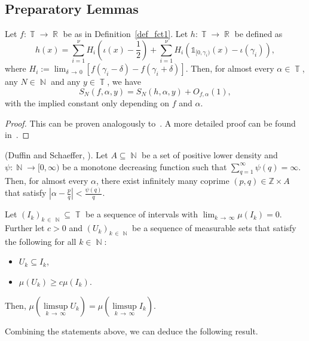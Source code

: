 \documentclass[AHL,Unicode,longabstracts,published]{cedram}
\DeclareMathOperator{\R}{\mathbb{R}}
\DeclareMathOperator{\N}{\mathbb{N}}
\DeclareMathOperator{\T}{\mathbb{T}}
\newcommand{\bbZ}{\mathbb{Z}}
\begin{document}
\subsection{Preparatory Lemmas}\label{Sec_prepLemmas}

\begin{prop}\label{LemRepresentationf}
Let $f : \T \rightarrow \R$ be as in Definition~\ref{def_fct1}. Let $h:\T \to \R$ be defined as
\[
h(x) = \sum_{i=1}^{\nu} H_i\left (\iota(x) - \frac{1}{2} \right) + \sum_{i=1}^{\nu} H_i \left(\mathds{1}_{[0, \gamma_i)}(x) -\iota(\gamma_i) \right),
\]
where $H_i := \lim_{\delta\,\rightarrow\,0} [f(\gamma_i - \delta) - f(\gamma_i + \delta)]$. Then, for almost every $\alpha \in \T$, any $N \in \N$ and any $y \in \T$, we have
\[
S_N(f,\alpha,y) = S_N(h,\alpha,y) + O_{f, \alpha}(1),
\]
with the implied constant only depending on $f$ and $\alpha$.
\end{prop}

\begin{proof}
This can be proven analogously to~\cite[Lemma~3.1]{upper_dens}. A more detailed proof can be found in~\cite[Appendix~A]{quenched}.
\end{proof}

\begin{prop}\label{ds_thm}
(Duffin and Schaeffer, \cite[Theorem~3]{duff_sch}).
Let $A \subseteq \N$ be a set of positive lower density and $\psi: \N \to [0,\infty)$ be a monotone decreasing function such that $\sum_{q =1}^{\infty} \psi(q) = \infty$. Then, for almost every $\alpha$, there exist infinitely many coprime $(p,q) \in \bbZ \times A$ that satisfy $| \alpha - \frac{p}{q}| < \frac{\psi(q)}{q}$.
\end{prop}

\begin{prop}\label{gallagher}
Let $(I_k)_{k\,\in\,\N} \subseteq \T$ be a sequence of intervals with $\lim_{k\,\to\,\infty} \mu(I_k) = 0$. Further let $c > 0$ and $(U_k)_{k\,\in\,\N}$ be a sequence of measurable sets that satisfy the following for all $k \in \N$:
\begin{itemize}
\item $U_k \subseteq I_k$,
\item $\mu(U_k) \geq c \mu(I_k)$.
\end{itemize}
Then, $\mu(\limsup\limits_{k\,\to\,\infty} U_k) = \mu(\limsup\limits_{k\,\to\,\infty} I_k)$.
\end{prop}


Combining the statements above, we can deduce the following result.
\end{document}
